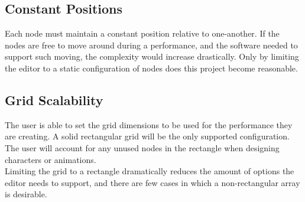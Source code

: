 \documentclass[12pt]{article}
\begin{document}
  	\subsection{Constant Positions}
    	Each node must maintain a constant position relative to one-another. If the nodes are free to move around during a performance, and the software needed to support such moving, the complexity would increase drastically. Only by limiting the editor to a static configuration of nodes does this project become reasonable. 
      
  	\subsection{Grid Scalability}
    	The user is able to set the grid dimensions to be used for the performance they are creating. A solid rectangular grid will be the only supported configuration. The user will account for any unused nodes in the rectangle when designing characters or animations. 
      \\
      Limiting the grid to a rectangle dramatically reduces the amount of options the editor needs to support, and there are few cases in which a non-rectangular array is desirable.  	
      
\newpage
\end{document}
